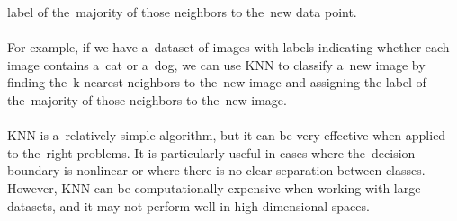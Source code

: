 \documentclass[12pt]{article}
\begin{document}
label of the~majority of those neighbors to the~new data point.\\
    \\
    For example, if we have a~dataset of images with labels indicating whether each image contains a~cat or a~dog, we can use KNN to classify a~new image by finding the~k-nearest neighbors to the~new image and assigning the label of the~majority of those neighbors to the~new image.\\
    \\
    KNN is a~relatively simple algorithm, but it can be very effective when applied to the~right problems.
It is particularly useful in cases where the~decision boundary is nonlinear or where there is no clear
separation between classes. However, KNN can be computationally expensive when working with large datasets, and
it may not perform well in high-dimensional spaces.
\end{document}
